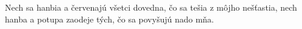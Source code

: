 Nech sa hanbia a červenajú všetci dovedna,
čo sa tešia z môjho nešťastia,
nech hanba a potupa zaodeje tých,
čo sa povyšujú nado mňa.